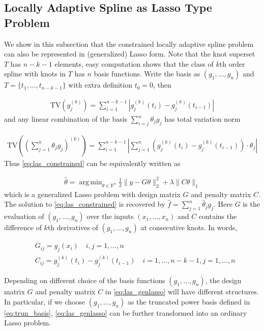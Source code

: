 \documentclass[a4paper]{article}
\DeclareMathOperator*{\argmin}{arg\,min}
\newcommand{\RR}{\mathbb{R}}
\begin{document}
\subsection{Locally Adaptive Spline as Lasso Type Problem}
\label{subsec:lasaslasso}
We show in this subsection that the constrained locally adaptive spline problem can also be represented in (generalized) Lasso form. Note that the knot superset $T$ has $n-k-1$ elements, easy computation shows that the class of $k$th order spline with knots in $T$ has $n$ basis functions. Write the basis as $(g_1,\ldots, g_n)$ and $T = \{t_1,\ldots, t_{n-k-1}\}$ with extra definition $t_0 = 0$, then

\begin{align*}
\text{TV}(g_j^{(k)}) = \sum_{i=1}^{n-k-1} |g_j^{(k)}(t_i) - g_j^{(k)}(t_{i-1})|
\end{align*}
and any linear combination of the basis $\sum_{i=j}^n \theta_jg_j$ has total variation norm

\begin{align*}
\text{TV}((\sum_{j=1}^n\theta_jg_j)^{(k)}) = \sum_{i=1}^{n-k-1}|\sum_{j=1}^n (g_j^{(k)}(t_i) - g_j^{(k)}(t_{i-1}))\cdot\theta_j|
\end{align*}
Thus \eqref{eq:las_constrained} can be equivalently written as

\begin{align}
\hat{\theta} = \argmin_{\theta\in\RR^n} \frac{1}{2}\|y-G\theta\|_2^2 + \lambda\|C\theta\|_1
\label{eq:las_genlasso}
\end{align}
which is a generalized Lasso problem with design matrix $G$ and penalty matrix $C$. The solution to \eqref{eq:las_constrained} is recovered by $\hat{f} = \sum_{j=1}^n \hat{\theta}_jg_j$. Here $G$ is the evaluation of $(g_1,\ldots, g_n)$ over the inputs $(x_1,\ldots, x_n)$ and $C$ contains the difference of $k$th derivatives of $(g_1,\ldots, g_n)$ at consecutive knots. In words,

\begin{equation}
\begin{aligned}
&G_{ij} = g_j(x_i) \quad i,j = 1,\ldots, n\\
&C_{ij} = g_j^{(k)}(t_i) - g_j^{(k)}(t_{i-1}) \quad i = 1,\ldots, n-k-1, j= 1,\ldots, n
\label{eq:lars_design}
\end{aligned}
\end{equation}

Depending on different choice of the basis functions $(g_1,\ldots, g_n)$, the design matrix $G$ and penalty matrix $C$ in \eqref{eq:las_genlasso} will have different structures. In particular, if we choose $(g_1,\ldots, g_n)$ as the truncated power basis defined in \eqref{eq:trun_basis}, \eqref{eq:las_genlasso} can be further transformed into an ordinary Lasso problem. 
\end{document}
